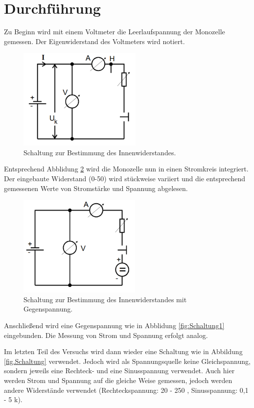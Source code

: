 \section{Durchführung}
\label{sec:Durchführung}
Zu Beginn wird mit einem Voltmeter die Leerlaufspannung der Monozelle gemessen.
Der Eigenwiderstand des Voltmeters wird notiert.

\begin{figure}[H]
  \centering
  \includegraphics[height=5cm]{Schaltung.PNG}
  \caption{Schaltung zur Bestimmung des Innenwiderstandes.}
  \label{fig:Schaltung}
\end{figure}

Entsprechend Abblidung \ref{fig:Schaltung} wird die Monozelle nun in einen
Stromkreis integriert. Der eingebaute Widerstand (0-50\Omega) wird stückweise variiert und
die entsprechend gemessenen Werte von Stromstärke und Spannung abgelesen.

\begin{figure}[H]
  \centering
  \includegraphics[height=5cm]{Schaltung1.PNG}
  \caption{Schaltung zur Bestimmung des Innenwiderstandes mit Gegenspannung.}
  \label{fig:Schaltung}
\end{figure}

Anschließend wird eine Gegenspannung wie in Abblidung \ref{fig:Schaltung1}
eingebunden. Die Messung von Strom und Spannung erfolgt analog.

Im letzten Teil des Versuchs wird dann wieder eine Schaltung wie in Abbildung
\ref{fig.Schaltung} verwendet. Jedoch wird als Spannungsquelle keine Gleichspannung,
sondern jeweils eine Rechteck- und eine Sinusspannung verwendet. Auch hier werden
Strom und Spannung auf die gleiche Weise gemessen, jedoch werden andere Widerstände
verwendet (Rechteckspannung: 20 - 250 \Omega, Sinusspannung: 0,1 - 5 k\Omega).
